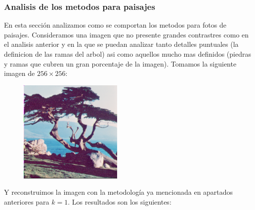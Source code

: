 \subsubsection{Analisis de los metodos para paisajes}

En esta sección analizamos como se comportan los metodos para fotos de paisajes. Consideramos una imagen que no presente grandes contrastres como en el analisis anterior y en la que se puedan analizar tanto detalles puntuales (la definicion de las ramas del arbol) asi como aquellos mucho mas definidos (piedras y ramas que cubren un gran porcentaje de la imagen). Tomamos la siguiente imagen de $256 \times 256$:

\begin{figure}[H]
\centering
\includegraphics[width=5cm]{fotos/paisaje/orig.png}
\end{figure}

Y reconstruimos la imagen con la metodología ya mencionada en apartados anteriores para $k=1$. Los resultados son los siguientes:

